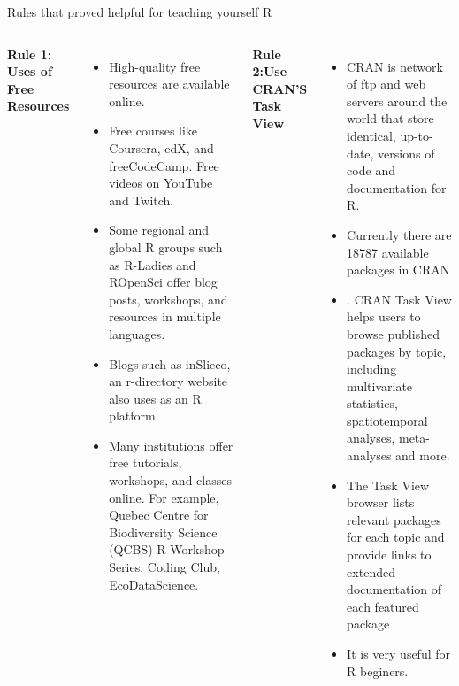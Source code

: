 \documentclass{beamer}
\begin{document}
	\begin{frame}[t]{Rules that proved helpful for teaching yourself R}
		\scriptsize
		
		\begin{columns}[t] 
			 {\textbf{Rule 1: Uses of Free Resources}}
			\begin{itemize}
				\item High-quality free resources are available online.
				\item   	Free courses like Coursera, edX, and freeCodeCamp. Free videos on YouTube and Twitch.
				\item   	Some regional and global R groups such as R-Ladies and ROpenSci offer blog posts, workshops, and resources in multiple languages.
				\item  	Blogs such as inSlieco, an r-directory website also uses as an R platform.
				\item  Many institutions offer free tutorials, workshops, and classes online. For example, Quebec Centre for Biodiversity Science (QCBS) R Workshop Series, Coding Club, EcoDataScience.
			\end{itemize}
			
			 {\textbf{Rule 2:Use CRAN'S Task View}}
			\begin{itemize}
				\item CRAN is network of ftp and web servers around the world that store identical, up-to-date, versions of code and documentation for R.
				\item   Currently there are 18787 available packages in CRAN 
				\item  . CRAN Task View helps users to browse published packages by topic, including multivariate statistics, spatiotemporal analyses, meta-analyses and more.
				\item The Task View browser lists relevant packages for each topic and provide links to extended documentation of each featured package
				\item It is very useful for R beginers.
				
			\end{itemize}	
			
		\end{columns}		
		
	\end{frame}
	
\end{document}
